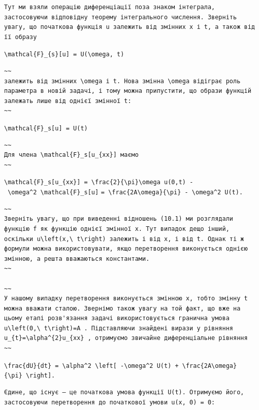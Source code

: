 \documentclass[
  ukrainian,
]{article}
\begin{document}
\begin{verbatim}
Тут ми взяли операцію диференціації поза знаком інтеграла, застосовуючи відповідну теорему інтегрального числення. Зверніть увагу, що початкова функція u залежить від змінних x і t, а також від її образу
\end{verbatim}

\texttt{\textbackslash{}mathcal\{F\}\_\{s\}{[}u{]}\ =\ U(\textbackslash{}omega,\ t)}

\begin{verbatim}
~~
залежить від змінних \omega і t. Нова змінна \omega відіграє роль параметра в новій задачі, і тому можна припустити, що образи функцій залежать лише від однієї змінної t:
~~
\end{verbatim}

\texttt{\textbackslash{}mathcal\{F\}\_s{[}u{]}\ =\ U(t)}

\begin{verbatim}
~~
Для члена \mathcal{F}_s[u_{xx}] маємо
~~
\end{verbatim}

\texttt{\textbackslash{}mathcal\{F\}\_s{[}u\_\{xx\}{]}\ =\ \textbackslash{}frac\{2\}\{\textbackslash{}pi\}\textbackslash{}omega\ u(0,t)\ -\ \textbackslash{}omega\^{}2\ \textbackslash{}mathcal\{F\}\_s{[}u{]}}
\texttt{=\ \textbackslash{}frac\{2A\textbackslash{}omega\}\{\textbackslash{}pi\}\ -\ \textbackslash{}omega\^{}2\ U(t).}

\begin{verbatim}
~~
Зверніть увагу, що при виведенні відношень (10.1) ми розглядали функцію f як функцію однієї змінної x. Тут випадок дещо інший, оскільки u\left(x,\ t\right) залежить і від x, і від t. Однак ті ж формули можна використовувати, якщо перетворення виконується однією змінною, а решта вважаються константами.
~~

~~
У нашому випадку перетворення виконується змінною x, тобто змінну t можна вважати сталою. Звернімо також увагу на той факт, що вже на цьому етапі розв'язання задачі використовується гранична умова u\left(0,\ t\right)=A . Підставляючи знайдені вирази у рівняння u_{t}=\alpha^{2}u_{xx} , отримуємо звичайне диференціальне рівняння
~~
\end{verbatim}

\texttt{\textbackslash{}frac\{dU\}\{dt\}\ =\ \textbackslash{}alpha\^{}2\ \textbackslash{}left{[}\ -\textbackslash{}omega\^{}2\ U(t)\ +\ \textbackslash{}frac\{2A\textbackslash{}omega\}\{\textbackslash{}pi\}\ \textbackslash{}right{]}.}

\begin{verbatim}
Єдине, що існує — це початкова умова функції U(t). Отримуємо його, застосовуючи перетворення до початкової умови u(x, 0) = 0:
\end{verbatim}
\end{document}
